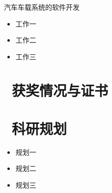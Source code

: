 \documentclass{resume}
\begin{document}
汽车车载系统的软件开发
\begin{itemize}
  \item 工作一
  \item 工作二
  \item 工作三
\end{itemize}


\section{\faHeartO\ 获奖情况与证书}

\section{\faInfo\ 科研规划}
\begin{itemize}[parsep=0.5ex]
  \item 规划一
  \item 规划二
  \item 规划三
\end{itemize}

% 
% 
\end{document}
